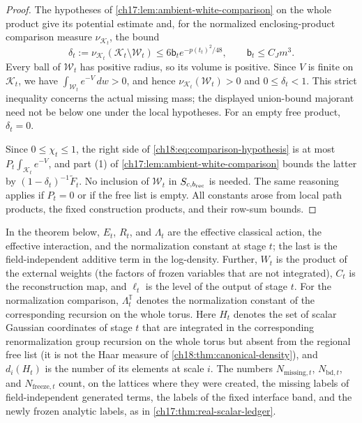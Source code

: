 \begin{proof}
The hypotheses of \cref{ch17:lem:ambient-white-comparison} on the whole product give its potential estimate and, for the normalized enclosing-product comparison measure $\nu_{\mathcal K_t}$, the bound
\[
 \delta_t:=\nu_{\mathcal K_t}(\mathcal K_t\setminus\mathcal W_t)
       \le6\mathsf b_te^{-p(t_t)^2/48},\qquad\mathsf b_t\le C_Jm^3.
\]
Every ball of $\mathcal W_t$ has positive radius, so its volume is positive. Since $V$ is finite on $\mathcal K_t$, we have $\int_{\mathcal W_t}e^{-V}\,dw>0$, and hence $\nu_{\mathcal K_t}(\mathcal W_t)>0$ and $0\le\delta_t<1$. This strict inequality concerns the actual missing mass; the displayed union-bound majorant need not be below one under the local hypotheses. For an empty free product, $\delta_t=0$.

Since $0\le\chi_t\le1$, the right side of \eqref{ch18:eq:comparison-hypothesis} is at most $P_t\int_{\mathcal K_t}e^{-V}$, and part (1) of \cref{ch17:lem:ambient-white-comparison} bounds the latter by $(1-\delta_t)^{-1}\widetilde F_t$. No inclusion of $\mathcal W_t$ in $S_{c,b_{\mathrm{rec}}}$ is needed. The same reasoning applies if $P_t=0$ or if the free list is empty. All constants arose from local path products, the fixed construction products, and their row-sum bounds.
\end{proof}

In the theorem below, $E_t$, $R_t$, and $\Lambda_t$ are the effective classical action, the effective interaction, and the normalization constant at stage $t$; the last is the field-independent additive term in the log-density. Further, $W_t$ is the product of the external weights (the factors of frozen variables that are not integrated), $C_t$ is the reconstruction map, and $\ell_t$ is the level of the output of stage $t$. For the normalization comparison, $\Lambda_t^{\mathbb T}$ denotes the normalization constant of the corresponding recursion on the whole torus. Here $H_t$ denotes the set of scalar Gaussian coordinates of stage $t$ that are integrated in the corresponding renormalization group recursion on the whole torus but absent from the regional free list (it is not the Haar measure of \cref{ch18:thm:canonical-density}), and $d_i(H_t)$ is the number of its elements at scale $i$. The numbers $N_{\mathrm{missing},t}$, $N_{\mathrm{bd},t}$, and $N_{\mathrm{freeze},t}$ count, on the lattices where they were created, the missing labels of field-independent generated terms, the labels of the fixed interface band, and the newly frozen analytic labels, as in \cref{ch17:thm:real-scalar-ledger}.

